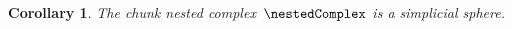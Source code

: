 \documentclass{amsart}
\newtheorem{corollary}[theorem]{Corollary}
\newtheorem{proposition}[theorem]{Proposition}
\theoremstyle{definition}
\newtheorem{example}[theorem]{Example}
\begin{document}
\begin{corollary} 
   The chunk nested complex~$\nestedComplex$ is a simplicial sphere.
\end{corollary}

%

\end{document}
